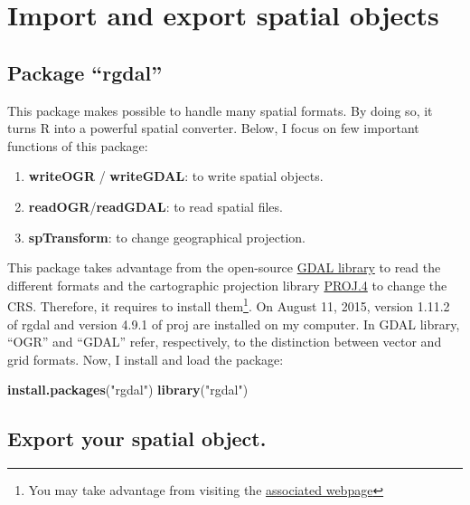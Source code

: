 \documentclass[]{report}
\newenvironment{Shaded}{\begin{snugshade}}{\end{snugshade}}
\newcommand{\KeywordTok}[1]{\textcolor[rgb]{0.13,0.29,0.53}{\textbf{#1}}}
\newcommand{\NormalTok}[1]{#1}
\newcommand{\StringTok}[1]{\textcolor[rgb]{0.31,0.60,0.02}{#1}}
\providecommand{\tightlist}{%
  \setlength{\itemsep}{0pt}\setlength{\parskip}{0pt}}
\let\rmarkdownfootnote\footnote%
\def\footnote{\protect\rmarkdownfootnote}
\begin{document}
\hypertarget{import-and-export-spatial-objects}{%
\chapter{Import and export spatial
objects}\label{import-and-export-spatial-objects}}

\hypertarget{package-rgdal}{%
\section{Package ``rgdal''}\label{package-rgdal}}

This package makes possible to handle many spatial formats. By doing so,
it turns R into a powerful spatial converter. Below, I focus on few
important functions of this package:

\begin{enumerate}
\def\labelenumi{\arabic{enumi}.}
\tightlist
\item
  \textbf{writeOGR} / \textbf{writeGDAL}: to write spatial objects.
\item
  \textbf{readOGR}/\textbf{readGDAL}: to read spatial files.
\item
  \textbf{spTransform}: to change geographical projection.
\end{enumerate}

This package takes advantage from the open-source
\href{http://www.gdal.org/index.html}{GDAL library} to read the
different formats and the cartographic projection library
\href{http://trac.osgeo.org/proj/}{PROJ.4} to change the CRS. Therefore,
it requires to install them\footnote{You may take advantage from
  visiting the
  \href{http://cran.r-project.org/web/packages/rgdal/index.html}{associated
  webpage}}. On August 11, 2015, version 1.11.2 of rgdal and version
4.9.1 of proj are installed on my computer. In GDAL library, ``OGR'' and
``GDAL'' refer, respectively, to the distinction between vector and grid
formats. Now, I install and load the package:

\begin{Shaded}
\begin{Highlighting}[]
\KeywordTok{install.packages}\NormalTok{(}\StringTok{"rgdal"}\NormalTok{)}
\KeywordTok{library}\NormalTok{(}\StringTok{"rgdal"}\NormalTok{)}
\end{Highlighting}
\end{Shaded}

\hypertarget{export-your-spatial-object.}{%
\section{Export your spatial
object.}\label{export-your-spatial-object.}}
\end{document}
